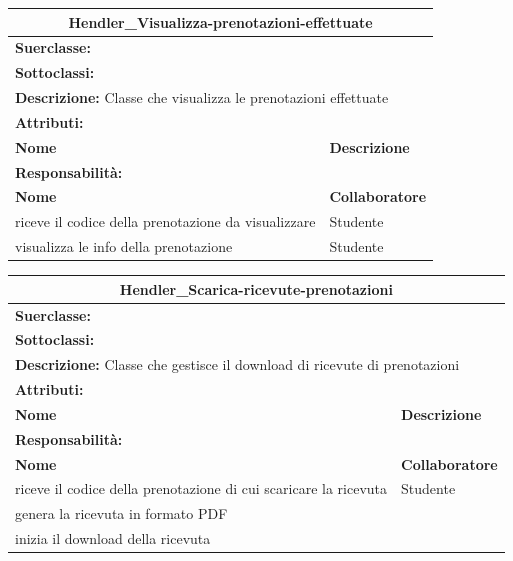 \documentclass[11pt]{article}
\begin{document}
\begin{table}[H]
\centering
\begin{tabularx}{1\textwidth}{|X|X|}\hline
\multicolumn{2}{|c|}{\textbf{Hendler\_Visualizza-prenotazioni-effettuate}}\\\hline
\multicolumn{2}{|l|}{\textbf{Suerclasse:}}\\\hline
\multicolumn{2}{|l|}{\textbf{Sottoclassi:}}\\\hline
\multicolumn{2}{|l|}{\textbf{Descrizione:} Classe che visualizza le prenotazioni effettuate}\\\hline
\multicolumn{2}{|l|}{\textbf{Attributi:}}\\
\textbf{Nome} & \textbf{Descrizione}\\
\hline
\multicolumn{2}{|l|}{\textbf{Responsabilità:}}\\
\textbf{Nome} & \textbf{Collaboratore}\\
riceve il codice della prenotazione da visualizzare & Studente\\
visualizza le info della prenotazione & Studente\\
\hline
\end{tabularx}
\end{table}


\begin{table}[H]
\centering
\begin{tabularx}{1\textwidth}{|X|X|}\hline
\multicolumn{2}{|c|}{\textbf{Hendler\_Scarica-ricevute-prenotazioni}}\\\hline
\multicolumn{2}{|l|}{\textbf{Suerclasse:}}\\\hline
\multicolumn{2}{|l|}{\textbf{Sottoclassi:}}\\\hline
\multicolumn{2}{|l|}{\textbf{Descrizione:} Classe che gestisce il download di ricevute di prenotazioni}\\\hline
\multicolumn{2}{|l|}{\textbf{Attributi:}}\\
\textbf{Nome} & \textbf{Descrizione}\\
\hline
\multicolumn{2}{|l|}{\textbf{Responsabilità:}}\\
\textbf{Nome} & \textbf{Collaboratore}\\
riceve il codice della prenotazione di cui scaricare la ricevuta & Studente\\
genera la ricevuta in formato PDF &\\
inizia il download della ricevuta &\\
\hline
\end{tabularx}
\end{table}
\end{document}
